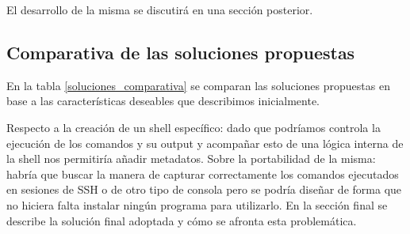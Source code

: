 El desarrollo de la misma se discutirá en una sección posterior.

\subsection{Comparativa de las soluciones propuestas}

\begin{table}[]
\caption{Tabla comparativa de las soluciones propuestas}
\label{soluciones_comparativa}
\end{table}

En la tabla \ref{soluciones_comparativa} se comparan las soluciones propuestas en base a las características deseables que describimos inicialmente.

Respecto a la creación de un shell específico: dado que podríamos controla la ejecución de los comandos y su output y acompañar esto de una lógica interna de la shell nos permitiría añadir metadatos. Sobre la portabilidad de la misma: habría que buscar la manera de capturar correctamente los comandos ejecutados en sesiones de SSH o de otro tipo de consola pero se podría diseñar de forma que no hiciera falta instalar ningún programa para utilizarlo. En la sección final se describe la solución final adoptada y cómo se afronta esta problemática.


